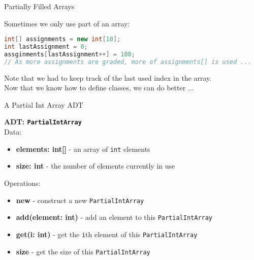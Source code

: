 \documentclass{beamer}
\begin{document}
\begin{frame}[fragile]{Partially Filled Arrays}


Sometimes we only use part of an array:
\begin{lstlisting}[language=Java]
int[] assignments = new int[10];
int lastAssignment = 0;
assginments[lastAssignment++] = 100;
// As more assignments are graded, more of assignments[] is used ...
\end{lstlisting}
Note that we had to keep track of the last used index in the array.\\
\vspace{.1in}
Now that we know how to define classes, we can do better ...

\end{frame}

\begin{frame}[fragile]{A Partial Int Array ADT}

{\bf ADT: {\tt PartialIntArray}}\\
Data:
\begin{itemize}
\item {\bf elements: int[]} - an array of {\tt int} elements
\item {\bf size: int} - the number of elements currently in use
\end{itemize}
Operations:
\begin{itemize}
\item {\bf new} - construct a new {\tt PartialIntArray}
\item {\bf add(element: int)} - add an element to this {\tt PartialIntArray}
\item {\bf get(i: int)} - get the {\tt i}th element of this {\tt PartialIntArray}
\item {\bf size} - get the size of this {\tt PartialIntArray}
\end{itemize}

\end{frame}
\end{document}
